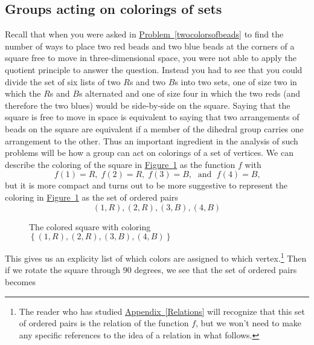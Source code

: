 \documentclass[10pt,]{book}
\theoremstyle{plain}
\theoremstyle{definition}
\theoremstyle{definition}
\numberwithin{equation}{chapter}
\begin{document}
\subsection[{Groups acting on colorings of sets}]{Groups acting on colorings of sets}\label{subsection-57}
Recall that when you were asked in \hyperref[twocolorsofbeads]{Problem~\ref{twocolorsofbeads}} to find the number of ways to place two red beads and two blue beads at the corners of a square free to move in three-dimensional space, you were not able to apply the quotient principle to answer the question. Instead you had to see that you could divide the set of six lists of two \(R\)s and two \(B\)s into two sets, one of size two in which the \(R\)s and \(B\)s alternated and one of size four in which the two reds (and therefore the two blues) would be side-by-side on the square. Saying that the square is free to move in space is equivalent to saying that two arrangements of beads on the square are equivalent if a member of the dihedral group carries one arrangement to the other. Thus an important ingredient in the analysis of such problems will be how a group can act on colorings of a set of vertices. We can describe the coloring of the square in \hyperref[colored-square]{Figure~\ref{colored-square}} as the function \(f\) with%
\begin{equation*}
f(1)=R,\; f(2)=R, \; f(3)=B,\;\text{ and }\;f(4)=B\text{,}
\end{equation*}
but it is more compact and turns out to be more suggestive to represent the coloring in \hyperref[colored-square]{Figure~\ref{colored-square}} as the set of ordered pairs%
\begin{equation}
(1,R), (2,R), (3,B), (4,B)\label{coloring-pairs}
\end{equation}
%
\begin{figure}
\centering
{
}
\caption{The colored square with coloring \(\left\{(1,R),(2,R),(3,B),(4,B)\right\}\)\label{colored-square}}
\end{figure}
This gives us an explicity list of which colors are assigned to which vertex.\footnote{The reader who has studied \hyperref[Relations]{Appendix~\ref{Relations}} will recognize that this set of ordered pairs is the relation of the function \(f\), but we won't need to make any specific references to the idea of a relation in what follows.\label{fn-22}} Then if we rotate the square through 90 degrees, we see that the set of ordered pairs becomes%
\end{document}
